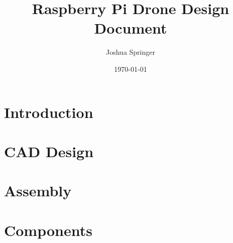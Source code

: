 \documentclass[conference]{IEEEtran}
\author{Joshua Springer}
\title{Raspberry Pi Drone Design Document}
\date{\specialdate\today}
\begin{document}
    \maketitle

    \section{Introduction}
    

    \section{CAD Design}
    

    \section{Assembly}
    

    \section{Components}
    
    
    
    
\end{document}
